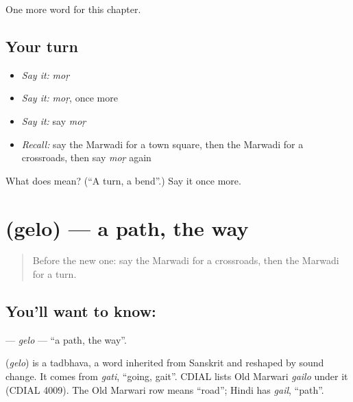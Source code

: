 \begin{grammarlens}[title={What you've built}]
One more word for this chapter.
\end{grammarlens}

\subsection*{Your turn}
\begin{itemize}
\raggedright
  \item \emph{Say it:} \emph{moṛ}
  \item \emph{Say it:} \emph{moṛ}, once more
  \item \emph{Say it:} say \emph{moṛ}
  \item \emph{Recall:} say the Marwadi for a town square, then the Marwadi for a crossroads, then say \emph{moṛ} again
\end{itemize}

\begin{tcolorbox}[breakable,colback=teal!4,colframe=teal!35!black,title={Before you move on}]
What does  mean? (\textquotedblleft{}A turn, a bend\textquotedblright{}.) Say it once more.
\end{tcolorbox}
\section[\texorpdfstring{\mw{गेलो} (gelo)}{गेलो (gelo)}]{ (gelo) — a path, the way}

\label{lesson:MW-C98-gelo}



\begin{quote}
Before the new one: say the Marwadi for a crossroads, then the Marwadi for a turn.
\end{quote}

\subsection*{You'll want to know: }
\textbf{} — \emph{gelo} — \textquotedblleft{}a path, the way\textquotedblright{}.

\begin{cousinweb}
\textbf{} (\emph{gelo}) is a tadbhava, a word inherited from Sanskrit and reshaped by sound change. It comes from \emph{gati}, \textquotedblleft{}going, gait\textquotedblright{}. CDIAL lists Old Marwari \emph{gailo} under it (CDIAL 4009). The Old Marwari row means \textquotedblleft{}road\textquotedblright{}; Hindi has \emph{gail}, \textquotedblleft{}path\textquotedblright{}.
\end{cousinweb}

